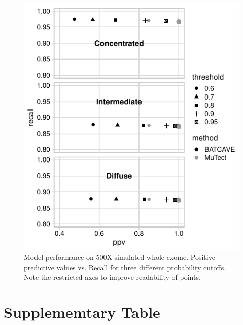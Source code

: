 \begin{figure}
  \begin{center}
  \includegraphics{figures/ppv_wgs.pdf}
  \end{center}
  \caption{Model performance on 500X simulated whole exome. 
  Positive predictive values vs. Recall for three different probability cutoffs. 
  Note the restricted axes to improve readability of points.}
\label{NAR-ppv_wgs_fig}
\end{figure}

\section{Supplememtary Table}

